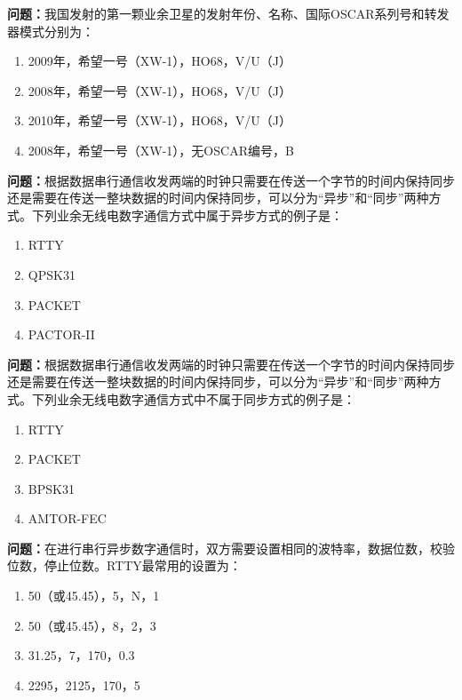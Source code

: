 \bigskip


\noindent\textbf{问题：}我国发射的第一颗业余卫星的发射年份、名称、国际OSCAR系列号和转发器模式分别为：
\begin{enumerate}[label=\Alph*), leftmargin=3em]
\item 2009年，希望一号（XW-1），HO68，V/U（J）
\item 2008年，希望一号（XW-1），HO68，V/U（J）
\item 2010年，希望一号（XW-1），HO68，V/U（J）
\item 2008年，希望一号（XW-1），无OSCAR编号，B
\end{enumerate}

\bigskip


\noindent\textbf{问题：}根据数据串行通信收发两端的时钟只需要在传送一个字节的时间内保持同步还是需要在传送一整块数据的时间内保持同步，可以分为“异步”和“同步”两种方式。下列业余无线电数字通信方式中属于异步方式的例子是：
\begin{enumerate}[label=\Alph*), leftmargin=3em]
\item RTTY
\item QPSK31
\item PACKET
\item PACTOR-II
\end{enumerate}

\bigskip


\noindent\textbf{问题：}根据数据串行通信收发两端的时钟只需要在传送一个字节的时间内保持同步还是需要在传送一整块数据的时间内保持同步，可以分为“异步”和“同步”两种方式。下列业余无线电数字通信方式中不属于同步方式的例子是：
\begin{enumerate}[label=\Alph*), leftmargin=3em]
\item RTTY
\item PACKET
\item BPSK31
\item AMTOR-FEC
\end{enumerate}

\bigskip


\noindent\textbf{问题：}在进行串行异步数字通信时，双方需要设置相同的波特率，数据位数，校验位数，停止位数。RTTY最常用的设置为：
\begin{enumerate}[label=\Alph*), leftmargin=3em]
\item 50（或45.45），5，N，1
\item 50（或45.45），8，2，3
\item 31.25，7，170，0.3
\item 2295，2125，170，5
\end{enumerate}

